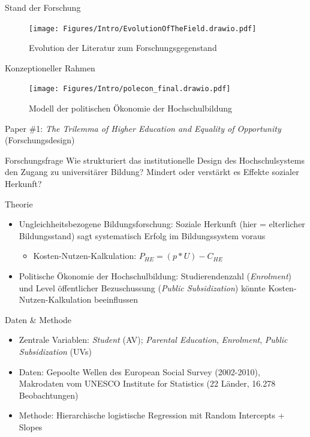 \documentclass[
  ignorenonframetext,
]{beamer}
\begin{document}
\begin{frame}{Stand der Forschung}
\protect\hypertarget{stand-der-forschung}{}
\begin{figure}
\centering
\texttt{[image: Figures/Intro/EvolutionOfTheField.drawio.pdf]}
\caption{Evolution der Literatur zum Forschungsgegenstand}
\end{figure}
\end{frame}

\begin{frame}{Konzeptioneller Rahmen}
\protect\hypertarget{konzeptioneller-rahmen}{}
\begin{figure}
\centering
\texttt{[image: Figures/Intro/polecon\_final.drawio.pdf]}
\caption{Modell der politischen Ökonomie der Hochschulbildung}
\end{figure}
\end{frame}

\begin{frame}{Paper \#1: \emph{The Trilemma of Higher Education and
Equality of Opportunity} (Forschungsdesign)}
\protect\hypertarget{paper-1-the-trilemma-of-higher-education-and-equality-of-opportunity-forschungsdesign}{}
\begin{block}{Forschungsfrage}
\scriptsize
Wie strukturiert das institutionelle Design des Hochschulsystems den Zugang zu universitärer Bildung? Mindert oder verstärkt es Effekte sozialer Herkunft?
\end{block}

\pause

\begin{exampleblock}{Theorie}
\begin{itemize}
\scriptsize
\item{Ungleichheitsbezogene Bildungsforschung: Soziale Herkunft (hier = elterlicher Bildungsstand) sagt systematisch Erfolg im Bildungssystem voraus}
\begin{itemize}
\scriptsize
\item{Kosten-Nutzen-Kalkulation: $P_{HE} = (p * U) - C_{HE}$}
\end{itemize}
\item{Politische Ökonomie der Hochschulbildung: Studierendenzahl (\textit{Enrolment}) und Level öffentlicher Bezuschussung (\textit{Public Subsidization}) könnte Kosten-Nutzen-Kalkulation beeinflussen}
\end{itemize}
\end{exampleblock}

\pause

\begin{alertblock}{Daten \& Methode}
\begin{itemize}
\scriptsize
\item{Zentrale Variablen: \textit{Student} (AV); \textit{Parental Education}, \textit{Enrolment}, \textit{Public Subsidization} (UVs)}
\item{Daten: Gepoolte Wellen des European Social Survey (2002-2010), Makrodaten vom UNESCO Institute for Statistics (22 Länder, 16.278 Beobachtungen)}
\item{Methode: Hierarchische logistische Regression mit Random Intercepts + Slopes}
\end{itemize}
\end{alertblock}
\end{frame}
\end{document}
